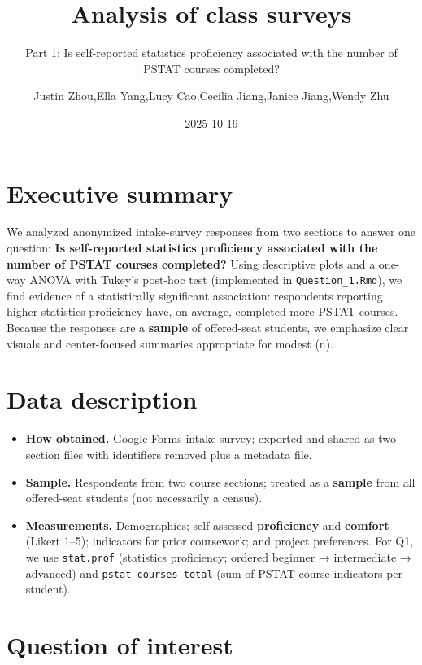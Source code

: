 \documentclass[
  letterpaper,
  DIV=11,
  numbers=noendperiod]{scrartcl}
\title{Analysis of class surveys}
\subtitle{Part 1: Is self-reported statistics proficiency associated
with the number of PSTAT courses completed?}
\author{Justin Zhou,Ella Yang,Lucy Cao,Cecilia Jiang,Janice Jiang,Wendy
Zhu}
\date{2025-10-19}
\providecommand{\tightlist}{%
  \setlength{\itemsep}{0pt}\setlength{\parskip}{0pt}}\usepackage{longtable,booktabs,array}
\renewcommand*\contentsname{Table of contents}
\newcommand\contentsname{Table of contents}
\begin{document}
\maketitle

\renewcommand*\contentsname{Table of contents}
{
\hypersetup{linkcolor=}
\setcounter{tocdepth}{3}
\tableofcontents
}

\section{Executive summary}\label{executive-summary}

We analyzed anonymized intake-survey responses from two sections to
answer one question: \textbf{Is self-reported statistics proficiency
associated with the number of PSTAT courses completed?} Using
descriptive plots and a one-way ANOVA with Tukey's post-hoc test
(implemented in \texttt{Question\_1.Rmd}), we find evidence of a
statistically significant association: respondents reporting higher
statistics proficiency have, on average, completed more PSTAT courses.
Because the responses are a \textbf{sample} of offered-seat students, we
emphasize clear visuals and center-focused summaries appropriate for
modest (n).

\section{Data description}\label{data-description}

\begin{itemize}
\tightlist
\item
  \textbf{How obtained.} Google Forms intake survey; exported and shared
  as two section files with identifiers removed plus a metadata file.\\
\item
  \textbf{Sample.} Respondents from two course sections; treated as a
  \textbf{sample} from all offered-seat students (not necessarily a
  census).\\
\item
  \textbf{Measurements.} Demographics; self-assessed
  \textbf{proficiency} and \textbf{comfort} (Likert 1--5); indicators
  for prior coursework; and project preferences. For Q1, we use
  \texttt{stat.prof} (statistics proficiency; ordered beginner →
  intermediate → advanced) and \texttt{pstat\_courses\_total} (sum of
  PSTAT course indicators per student).
\end{itemize}

\section{Question of interest}\label{question-of-interest}
\end{document}
